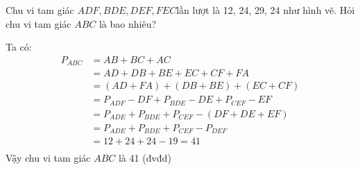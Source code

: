 \begin{bt}
	Chu vi tam giác $ADF,BDE,DEF,FEC$lần lượt là 12, 24, 29, 24 như hình vẽ. Hỏi chu vi tam giác $ABC$ là bao nhiêu?
	\begin{loigiaichuong38}
		Ta có:
		\begin{align*}
			{{P}_{ABC}}&=AB+BC+AC \\ 
			& =AD+DB+BE+EC+CF+FA \\ 
			& =(AD+FA)+(DB+BE)+(EC+CF) \\ 
			& ={{P}_{ADF}}-DF+{{P}_{BDE}}-DE+{{P}_{CEF}}-EF \\ 
			& ={{P}_{ADE}}+{{P}_{BDE}}+{{P}_{CEF}}-(DF+DE+EF) \\ 
			& ={{P}_{ADE}}+{{P}_{BDE}}+{{P}_{CEF}}-{{P}_{DEF}} \\ 
			& =12+24+24-19=41 \\ 
		\end{align*}
		Vậy chu vi tam giác $ABC$ là 41 (đvđd)
	\end{loigiaichuong38}
\end{bt}


